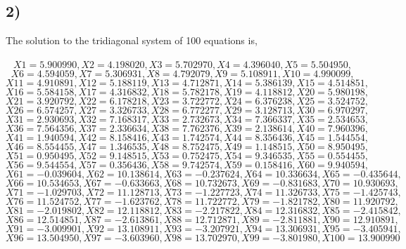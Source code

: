 \documentclass[12pt, oneside]{article}
\begin{document}
\subsection*{2)}
The solution to the tridiagonal system of 100 equations is,\\\\
\[ X1 = 5.900990, X2 = 4.198020, X3 = 5.702970, X4 = 4.396040, X5 = 5.504950, \]
\[ X6 = 4.594059, X7 = 5.306931, X8 = 4.792079, X9 = 5.108911, X10 = 4.990099,  \]
\[ X11 = 4.910891, X12 = 5.188119, X13 = 4.712871, X14 = 5.386139, X15 = 4.514851,  \]
\[ X16 = 5.584158, X17 = 4.316832, X18 = 5.782178, X19 = 4.118812, X20 = 5.980198,  \]
\[ X21 = 3.920792, X22 = 6.178218, X23 = 3.722772, X24 = 6.376238, X25 = 3.524752,  \]
\[ X26 = 6.574257, X27 = 3.326733, X28 = 6.772277, X29 = 3.128713, X30 = 6.970297,  \]
\[ X31 = 2.930693, X32 = 7.168317, X33 = 2.732673, X34 = 7.366337, X35 = 2.534653,  \]
\[ X36 = 7.564356, X37 = 2.336634, X38 = 7.762376, X39 = 2.138614, X40 = 7.960396,  \]
\[ X41 = 1.940594, X42 = 8.158416, X43 = 1.742574, X44 = 8.356436, X45 = 1.544554,  \]
\[ X46 = 8.554455, X47 = 1.346535, X48 = 8.752475, X49 = 1.148515, X50 = 8.950495,  \]
\[ X51 = 0.950495, X52 = 9.148515, X53 = 0.752475, X54 = 9.346535, X55 = 0.554455,  \]
\[ X56 = 9.544554, X57 = 0.356436, X58 = 9.742574, X59 = 0.158416, X60 = 9.940594,  \]
\[ X61 = -0.039604, X62 = 10.138614, X63 = -0.237624, X64 = 10.336634, X65 = -0.435644,  \]
\[ X66 = 10.534653, X67 = -0.633663, X68 = 10.732673, X69 = -0.831683, X70 = 10.930693,  \]
\[ X71 = -1.029703, X72 = 11.128713, X73 = -1.227723, X74 = 11.326733, X75 = -1.425743,  \]
\[ X76 = 11.524752, X77 = -1.623762, X78 = 11.722772, X79 = -1.821782, X80 = 11.920792,  \]
\[ X81 = -2.019802, X82 = 12.118812, X83 = -2.217822, X84 = 12.316832, X85 = -2.415842,  \]
\[ X86 = 12.514851, X87 = -2.613861, X88 = 12.712871, X89 = -2.811881, X90 = 12.910891,  \]
\[ X91 = -3.009901, X92 = 13.108911, X93 = -3.207921, X94 = 13.306931, X95 = -3.405941,  \]
\[ X96 = 13.504950, X97 = -3.603960, X98 = 13.702970, X99 = -3.801980, X100 = 13.900990 \]
\end{document}
